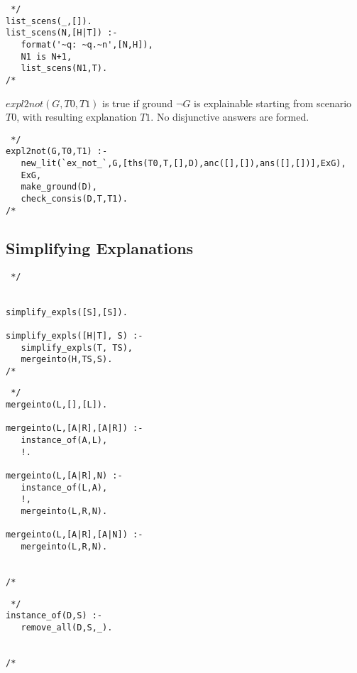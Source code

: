 \begin{verbatim} */
list_scens(_,[]).
list_scens(N,[H|T]) :-
   format('~q: ~q.~n',[N,H]),
   N1 is N+1,
   list_scens(N1,T).
/* \end{verbatim}

$expl2not(G,T0,T1)$ is true if ground $\neg G$ is explainable starting from
scenario $T0$, with resulting explanation $T1$. No disjunctive answers are
formed.
\begin{verbatim} */
expl2not(G,T0,T1) :-
   new_lit(`ex_not_`,G,[ths(T0,T,[],D),anc([],[]),ans([],[])],ExG),
   ExG,
   make_ground(D),
   check_consis(D,T,T1).
/* \end{verbatim}

\subsection{Simplifying Explanations}
\begin{verbatim} */
                                   

simplify_expls([S],[S]).

simplify_expls([H|T], S) :-
   simplify_expls(T, TS),
   mergeinto(H,TS,S).
/* \end{verbatim}
\begin{verbatim} */
mergeinto(L,[],[L]).

mergeinto(L,[A|R],[A|R]) :-
   instance_of(A,L),
   !.

mergeinto(L,[A|R],N) :-
   instance_of(L,A),
   !,
   mergeinto(L,R,N).

mergeinto(L,[A|R],[A|N]) :-
   mergeinto(L,R,N).

                         
/* \end{verbatim}

\begin{verbatim} */
instance_of(D,S) :-
   remove_all(D,S,_).
                           

/* \end{verbatim}

